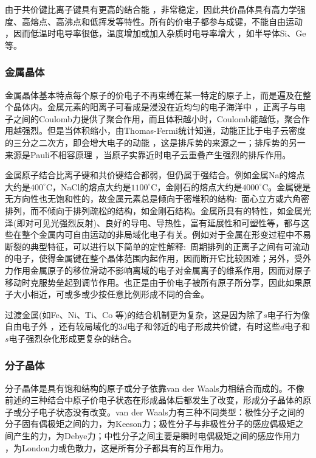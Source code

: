 由于共价键比离子键具有更高的结合能 ，非常稳定，因此共价晶体具有高力学强度、高熔点、高沸点和低挥发等特性。所有的价电子都参与成键，不能自由运动 ，因而低温时电导率很低，温度增加或加入杂质时电导率增大 ，如半导体Si、Ge等。

\subsubsection{金属晶体} 
金属晶体基本特点每个原子的价电子不再束缚在某一特定的原子上，而是遍及在整个晶体内。金属元素的阳离子可看成是浸没在近均匀的电子海洋中 ，正离子与电子之间的Coulomb力提供了聚合作用，而且体积越小时，Coulomb能越低，聚合作用越强烈。但是当体积缩小，由Thomas-Fermi统计知道，动能正比于电子云密度的三分之二次方，即会增大电子的动能 ，这是排斥势的来源之一；排斥势的另一来源是Pauli不相容原理 ，当原子实靠近时电子云重叠产生强烈的排斥作用。

金属原子结合比离子键和共价键结合都弱，但仍属于强结合。例如金属Na的熔点大约是$400^{\circ}\mathrm{C}$，NaCl的熔点大约是$1100^{\circ}\mathrm{C}$，金刚石的熔点大约是$4000^{\circ}\mathrm{C}$。金属键是无方向性也无饱和性的，故金属元素总是倾向于密堆积的结构:~面心立方或六角密排列，而不倾向于排列疏松的结构，如金刚石结构。金属所具有的特性，如金属光泽(即对可见光强烈反射)、良好的导电、导热性，富有延展性和可塑性等，都与这些在整个金属内可自由运动的非局域化电子有关。例如对于金属在形变过程中不易断裂的典型特征，可以进行以下简单的定性解释:~周期排列的正离子之间有可流动的电子，使得金属键在整个晶体范围内起作用，因而断开它比较困难；另外，受外力作用金属原子的移位滑动不影响离域的电子对金属离子的维系作用，因而对原子移动时克服势垒起到调节作用。也正是由于价电子被所有原子所分享，因此如果原子大小相近，可或多或少按任意比例形成不同的合金。

过渡金属(如Fe、Ni、Ti、Co 等)的结合机制更为复杂，这是因为除了$s$电子行为像自由电子外 ，还有较局域化的$3d$电子和邻近的电子形成共价键，有时这些$d$电子和$s$电子强烈杂化形成更复杂的结合。

\subsubsection{分子晶体} 
分子晶体是具有饱和结构的原子或分子依靠van der Waals力相结合而成的。不像前述的三种结合中原子价电子状态在形成晶体后都发生了改变，形成分子晶体的原子或分子电子状态没有改变。van der Waals力有三种不同类型：极性分子之间的分子固有偶极矩之间的力，为Keeson力；极性分子与非极性分子的感应偶极矩之间产生的力，为Debye力；中性分子之间主要是瞬时电偶极矩之间的感应作用力 ，为London力或色散力，这是所有分子都具有的互作用力。


